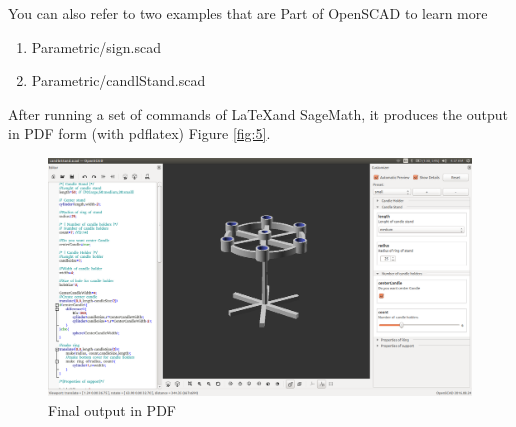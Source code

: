 You can also refer to  two examples that are Part of OpenSCAD to learn more
\begin{enumerate}
	\item Parametric/sign.scad
	\item Parametric/candlStand.scad
\end{enumerate}

After running a set of commands of \LaTeX and SageMath, it produces the
output in PDF form (with pdflatex) Figure \ref{fig:5}.

\begin{figure}[H] 
\centering \includegraphics[scale=0.31]{images/output/9.png}
\caption{Final output in PDF}
\label{fig:8}
\end{figure}
